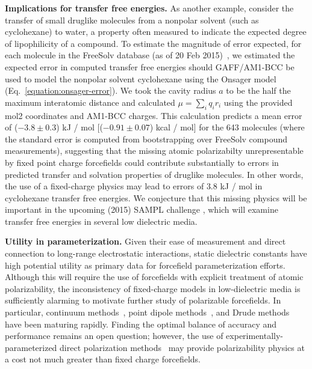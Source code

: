 \documentclass[aip, jcp, reprint]{revtex4-1}  %
\begin{document}
{\bf Implications for transfer free energies.}
As another example, consider the transfer of small druglike molecules from a nonpolar solvent (such as cyclohexane) to water, a property often measured to indicate the expected degree of lipophilicity of a compound.
To estimate the magnitude of error expected, for each molecule in the FreeSolv database (as of 20 Feb 2015)~\cite{freesolv, freesolv_github}, we estimated the expected error in computed transfer free energies should GAFF/AM1-BCC be used to model the nonpolar solvent cyclohexane using the Onsager model (Eq.~\ref{equation:onsager-error}).
We took the cavity radius $a$ to be the half the maximum interatomic distance and calculated $\mu = \sum_i q_i r_i$ using the provided mol2 coordinates and AM1-BCC charges.  
This calculation predicts a mean error of ($-3.8 \pm 0.3$) kJ / mol [($-0.91 \pm0.07$) kcal / mol] for the 643 molecules (where the standard error is computed from bootstrapping over FreeSolv compound measurements), 
suggesting that the missing atomic polarizabilty unrepresentable by fixed point charge forcefields could contribute substantially to errors in predicted transfer and solvation properties of druglike molecules.  
In other words, the use of a fixed-charge physics may lead to errors of $3.8$ kJ / mol in cyclohexane transfer free energies.  
We conjecture that this missing physics will be important in the upcoming (2015) SAMPL challenge \cite{newman2009practical}, which will examine transfer free energies in several low dielectric media. 

{\bf Utility in parameterization.}
Given their ease of measurement and direct connection to long-range electrostatic interactions, static dielectric constants have high potential utility as primary data for forcefield parameterization efforts.  
Although this will require the use of forcefields with explicit treatment of atomic polarizability, the inconsistency of fixed-charge models in low-dielectric media is sufficiently alarming to motivate further study of polarizable forcefields.  In particular, continuum methods~\cite{truchon2010using, truchon2009integrated, truchon2008accurate}, point dipole methods~\cite{Ponder2010, ren2004temperature}, and Drude methods~\cite{lamoureux2003modeling, anisimov2005determination} have been maturing rapidly.  Finding the optimal balance of accuracy and performance remains an open question; however, the use of experimentally-parameterized direct polarization methods~\cite{wang2013systematic} may provide polarizability physics at a cost not much greater than fixed charge forcefields.
\end{document}
